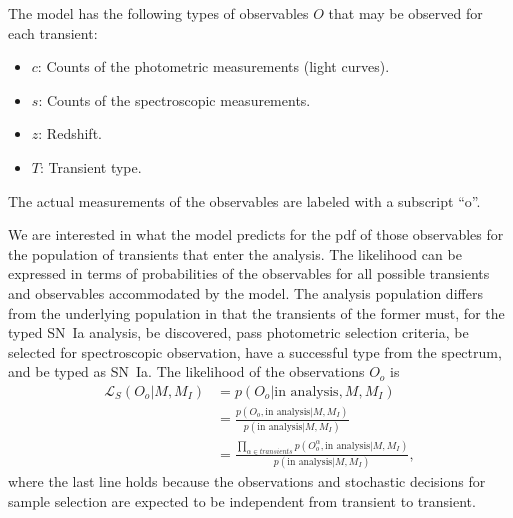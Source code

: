 \documentclass[preprint,3p]{elsarticle}
\begin{document}
The model has the following types of observables $O$ that
may be observed for each transient:
\begin{itemize}
\item $c$: Counts of the photometric measurements (light curves).
\item $s$: Counts of the spectroscopic measurements.
\item $z$: Redshift.
\item $T$: Transient type.
\end{itemize}
The actual measurements of the observables are labeled  with a subscript ``o''.


We are interested in what the model predicts for the pdf of those observables
for the population of transients that enter the analysis.  
The likelihood can be expressed in terms of probabilities of the observables
for all possible transients and observables accommodated by the model.
The analysis population differs from the underlying population in that the transients of the former 
must, for the typed SN~Ia analysis, be discovered, pass photometric selection criteria, be selected for spectroscopic
observation, have a successful type from the spectrum, and be typed as SN~Ia.
The likelihood of the observations $O_o$ is
\begin{align*}
\mathcal{L}_S(O_o | M, M_I) & = p(O_o |\text{in analysis}, M, M_I)\\
& = \frac{ p(O_o, \text{in analysis}|M, M_I)}{p(\text{in analysis}|M, M_I)}\\
&  = \frac{\prod_{\alpha \in transients} p(O_o^\alpha, \text{in analysis}|M, M_I)}{p(\text{in analysis}|M, M_I)},
\end{align*}
where the last line holds because the observations and stochastic decisions
for sample selection are expected to be independent from transient to transient.
\end{document}
